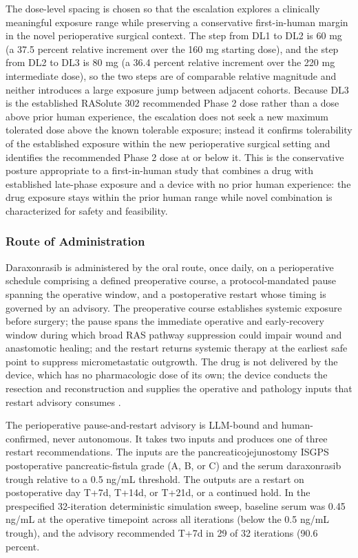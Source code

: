 The dose-level spacing is chosen so that the escalation explores a clinically
meaningful exposure range while preserving a conservative first-in-human margin in
the novel perioperative surgical context. The step from DL1 to DL2 is 60 mg (a 37.5
percent relative increment over the 160 mg starting dose), and the step from DL2 to
DL3 is 80 mg (a 36.4 percent relative increment over the 220 mg intermediate dose),
so the two steps are of comparable relative magnitude and neither introduces a large
exposure jump between adjacent cohorts. Because DL3 is the established RASolute 302
recommended Phase 2 dose rather than a dose above prior human experience, the
escalation does not seek a new maximum tolerated dose above the known tolerable
exposure; instead it confirms tolerability of the established exposure within the new
perioperative surgical setting and identifies the recommended Phase 2 dose at or
below it. This is the conservative posture appropriate to a first-in-human study
that combines a drug with established late-phase exposure and a device with no prior
human experience: the drug exposure stays within the prior human range while
novel combination is characterized for safety and feasibility.

\subsubsection{Route of Administration}

Daraxonrasib is administered by the oral route, once daily, on a perioperative
schedule comprising a defined preoperative course, a protocol-mandated pause
spanning the operative window, and a postoperative restart whose timing is governed
by an advisory. The preoperative course establishes systemic exposure before
surgery; the pause spans the immediate operative and early-recovery window during
which broad RAS pathway suppression could impair wound and anastomotic healing; and
the restart returns systemic therapy at the earliest safe point to suppress
micrometastatic outgrowth. The drug is not delivered by the device, which has no
pharmacologic dose of its own; the device conducts the resection and reconstruction
and supplies the operative and pathology inputs that restart advisory consumes
\cite{daraxwhipple}.

The perioperative pause-and-restart advisory is LLM-bound and human-confirmed, never
autonomous. It takes two inputs and produces one of three restart recommendations.
The inputs are the pancreaticojejunostomy ISGPS postoperative pancreatic-fistula
grade (A, B, or C) and the serum daraxonrasib trough relative to a 0.5 ng/mL
threshold. The outputs are a restart on postoperative day T+7d, T+14d, or T+21d, or
a continued hold. In the prespecified 32-iteration deterministic simulation sweep,
baseline serum was 0.45 ng/mL at the operative timepoint across all iterations
(below the 0.5 ng/mL trough), and the advisory recommended T+7d in 29 of 32
iterations (90.6 percent.

